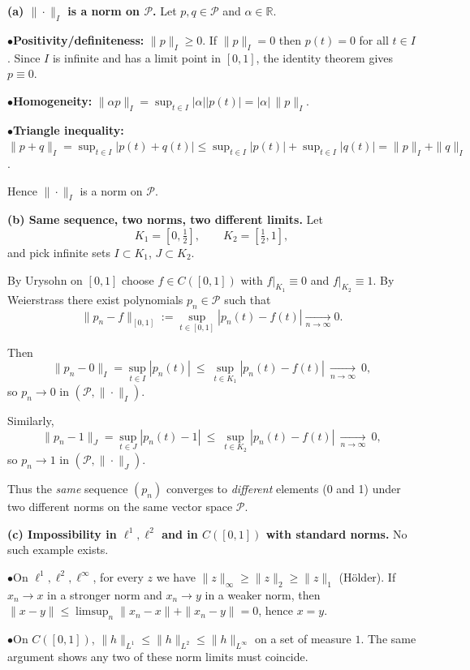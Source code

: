 \begin{solution}
\par\smallskip\noindent\textbf{(a) $\|\cdot\|_{I}$ is a norm on $\mathcal{P}$.}\quad
Let $p,q\in\mathcal{P}$ and $\alpha\in\mathbb{R}$.

	\par\smallskip\noindent\(\bullet\)\quad \textbf{Positivity/definiteness:} $\|p\|_{I}\ge0$.
	If $\|p\|_{I}=0$ then $p(t)=0$ for all $t\in I$.
	Since $I$ is infinite and has a limit point in $[0,1]$, the identity theorem gives $p\equiv0$.
	\par\smallskip\noindent\(\bullet\)\quad \textbf{Homogeneity:} $\|\alpha p\|_{I}=\sup_{t\in I}|\alpha||p(t)|=|\alpha|\,\|p\|_{I}$.
	\par\smallskip\noindent\(\bullet\)\quad \textbf{Triangle inequality:}
	$\|p+q\|_{I}=\sup_{t\in I}|p(t)+q(t)|\le \sup_{t\in I}|p(t)|+\sup_{t\in I}|q(t)|=\|p\|_{I}+\|q\|_{I}$.

Hence $\|\cdot\|_{I}$ is a norm on $\mathcal{P}$.

\bigskip
\par\medskip\noindent\textbf{(b) Same sequence, two norms, two different limits.}\quad
Let
\[
K_1=[0,\tfrac12],\qquad K_2=[\tfrac12,1],
\]
and pick infinite sets $I\subset K_1$, $J\subset K_2$.

By Urysohn on $[0,1]$ choose $f\in C([0,1])$ with $f|_{K_1}\equiv0$ and $f|_{K_2}\equiv1$.
By Weierstrass there exist polynomials $p_n\in\mathcal{P}$ such that
\[
\|p_n-f\|_{[0,1]}:=\sup_{t\in[0,1]}|p_n(t)-f(t)| \xrightarrow[n\to\infty]{} 0.
\]

Then
\[
\|p_n-0\|_{I}=\sup_{t\in I}|p_n(t)|
\ \le\ \sup_{t\in K_1}|p_n(t)-f(t)|
\ \xrightarrow[n\to\infty]{}\ 0,
\]
so $p_n\to 0$ in $(\mathcal{P},\|\cdot\|_{I})$.

Similarly,
\[
\|p_n-1\|_{J}=\sup_{t\in J}|p_n(t)-1|
\ \le\ \sup_{t\in K_2}|p_n(t)-f(t)|
\ \xrightarrow[n\to\infty]{}\ 0,
\]
so $p_n\to 1$ in $(\mathcal{P},\|\cdot\|_{J})$.

\medskip
\noindent
Thus the \emph{same} sequence $(p_n)$ converges to \emph{different} elements (0 and 1) under two different norms on the same vector space $\mathcal{P}$.

\bigskip
\par\medskip\noindent\textbf{(c) Impossibility in $\ell^1,\ell^2$ and in $C([0,1])$ with standard norms.}\quad
No such example exists.

	\par\smallskip\noindent\(\bullet\)\quad On $\ell^1,\ell^2,\ell^\infty$, for every $z$ we have
	$\|z\|_\infty\ge \|z\|_2\ge \|z\|_1$ (Hölder).
	If $x_n\to x$ in a stronger norm and $x_n\to y$ in a weaker norm,
	then $\|x-y\|\le \limsup_n \|x_n-x\|+\|x_n-y\|=0$, hence $x=y$.
	\par\smallskip\noindent\(\bullet\)\quad On $C([0,1])$,
	$\|h\|_{L^1}\le \|h\|_{L^2}\le \|h\|_{L^\infty}$ on a set of measure $1$.
	The same argument shows any two of these norm limits must coincide.
\end{solution}

